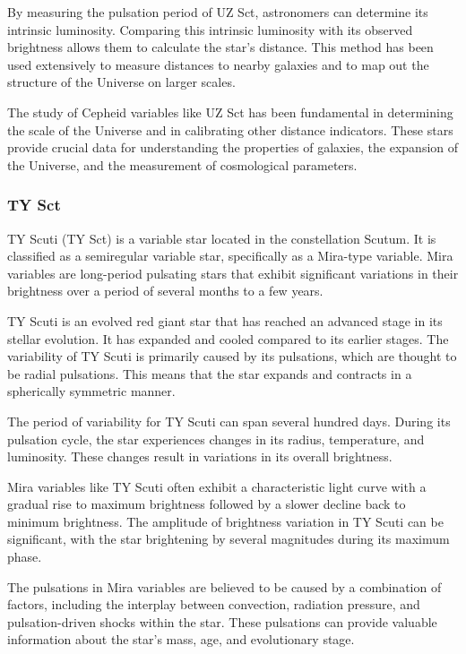 By measuring the pulsation period of UZ Sct, astronomers can determine its intrinsic luminosity. Comparing this intrinsic luminosity with its observed brightness allows them to calculate the star's distance. This method has been used extensively to measure distances to nearby galaxies and to map out the structure of the Universe on larger scales.

The study of Cepheid variables like UZ Sct has been fundamental in determining the scale of the Universe and in calibrating other distance indicators. These stars provide crucial data for understanding the properties of galaxies, the expansion of the Universe, and the measurement of cosmological parameters.

\subsubsection*{ TY Sct }
TY Scuti (TY Sct) is a variable star located in the constellation Scutum. It is classified as a semiregular variable star, specifically as a Mira-type variable. Mira variables are long-period pulsating stars that exhibit significant variations in their brightness over a period of several months to a few years.

TY Scuti is an evolved red giant star that has reached an advanced stage in its stellar evolution. It has expanded and cooled compared to its earlier stages. The variability of TY Scuti is primarily caused by its pulsations, which are thought to be radial pulsations. This means that the star expands and contracts in a spherically symmetric manner.

The period of variability for TY Scuti can span several hundred days. During its pulsation cycle, the star experiences changes in its radius, temperature, and luminosity. These changes result in variations in its overall brightness.

Mira variables like TY Scuti often exhibit a characteristic light curve with a gradual rise to maximum brightness followed by a slower decline back to minimum brightness. The amplitude of brightness variation in TY Scuti can be significant, with the star brightening by several magnitudes during its maximum phase.

The pulsations in Mira variables are believed to be caused by a combination of factors, including the interplay between convection, radiation pressure, and pulsation-driven shocks within the star. These pulsations can provide valuable information about the star's mass, age, and evolutionary stage.

